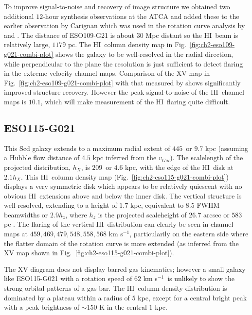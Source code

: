 \documentclass[traditabstract]{aa} %
\newcommand\HI{H{\small I}}
\newcommand\kms{km s$^{-1}$}
\begin{document}
To improve signal-to-noise and recovery of image structure we obtained
two additional $12$-hour synthesis observations at the ATCA and added
these to the earlier observation by Carignan which was used in the
rotation curve analysis by \citet{abeetal1999} and \citet{vdkjvkf2001}.  
The distance of ESO109-G21 is about $30$ Mpc distant so the 
\HI\ beam is relatively large, $1179$ pc. The \HI\ column density map in
Fig.~\ref{fig:ch2-eso109-g021-combi-plot} shows the galaxy to be
well-resolved in the radial direction, while perpendicular to the
plane the resolution is just sufficient to detect flaring in the
extreme velocity channel maps. Comparison of the XV map in
Fig.~\ref{fig:ch2-eso109-g021-combi-plot} with that measured by
\citet{vdkjvkf2001} shows significantly improved structure recovery.
However the peak signal-to-noise of the \HI\ channel maps is $10.1$,
which will make measurement of the \HI\ flaring quite difficult.



\subsection{ESO115-G021}

This Scd galaxy extends to a maximum radial extent of $445$\arcsec\ or
$9.7$ kpc (assuming a Hubble flow distance of $4.5$ kpc inferred from
the $v_{Gal}$). The scalelength of the projected distribution, $h_X$,
is $209$\arcsec\ or $4.6$ kpc, with the edge of the \HI\ disk at
$2.1h_X$. This \HI\ column density map
(Fig.~\ref{fig:ch2-eso115-g021-combi-plot}) displays a very
symmetric disk which appears to be relatively quiescent with no
obvious \HI\ extensions above and below the inner disk. The vertical
structure is well-resolved, extending to a height of $1.7$
kpc, equivalent to 8.5 FWHM beamwidths or $2.9 h_z$, where $h_z$ is
the projected scaleheight of $26.7$ arcsec or $583$ pc . The flaring
of the vertical \HI\ distribution can clearly be seen in channel
maps at $459,
469, 479, 548, 558, 568$ \kms, particularily on the eastern
side where the flatter domain of the rotation curve is more extended
(as inferred from the XV map shown in
Fig.~\ref{fig:ch2-eso115-g021-combi-plot}).

The XV diagram does not display barred gas kinematics; however
a small galaxy like ESO115-G021 with a rotation speed of $62$ \kms\ is
unlikely to show the strong orbital patterns of a gas
bar. The \HI\ column density distribution is dominated by a plateau
within a radius of $5$ kpc, except for a central bright peak with a
peak brightness of $\sim$150 K in the central $1$ kpc.
\end{document}
